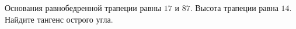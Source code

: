 \begin{ex}
	\begin{condition}
		Основания равнобедренной трапеции равны \( 17  \) и \( 87 \). Высота трапеции равна \( 14 \). Найдите тангенс острого угла.	
	\end{condition}
\end{ex}
